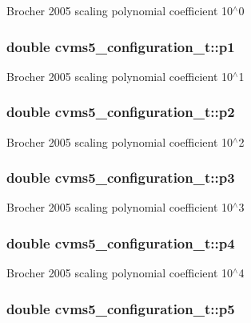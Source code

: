 Brocher 2005 scaling polynomial coefficient 10$^\wedge$0 \hypertarget{structcvms5__configuration__t_a8bf5ffc779374ab9448d217d104b6182}{
\subsubsection[{p1}]{\setlength{\rightskip}{0pt plus 5cm}double cvms5\+\_\+configuration\+\_\+t\+::p1}}\label{structcvms5__configuration__t_a8bf5ffc779374ab9448d217d104b6182}
Brocher 2005 scaling polynomial coefficient 10$^\wedge$1 \hypertarget{structcvms5__configuration__t_aa460736127fc2535673fc18800c6eb0c}{
\subsubsection[{p2}]{\setlength{\rightskip}{0pt plus 5cm}double cvms5\+\_\+configuration\+\_\+t\+::p2}}\label{structcvms5__configuration__t_aa460736127fc2535673fc18800c6eb0c}
Brocher 2005 scaling polynomial coefficient 10$^\wedge$2 \hypertarget{structcvms5__configuration__t_a03959cb46e3581897f31fff80159c67c}{
\subsubsection[{p3}]{\setlength{\rightskip}{0pt plus 5cm}double cvms5\+\_\+configuration\+\_\+t\+::p3}}\label{structcvms5__configuration__t_a03959cb46e3581897f31fff80159c67c}
Brocher 2005 scaling polynomial coefficient 10$^\wedge$3 \hypertarget{structcvms5__configuration__t_a12aafb20aa62f080b7e2b89afc7d82fb}{
\subsubsection[{p4}]{\setlength{\rightskip}{0pt plus 5cm}double cvms5\+\_\+configuration\+\_\+t\+::p4}}\label{structcvms5__configuration__t_a12aafb20aa62f080b7e2b89afc7d82fb}
Brocher 2005 scaling polynomial coefficient 10$^\wedge$4 \hypertarget{structcvms5__configuration__t_a40e1c6f8058d9c00ebfb2b4986813acb}{
\subsubsection[{p5}]{\setlength{\rightskip}{0pt plus 5cm}double cvms5\+\_\+configuration\+\_\+t\+::p5}}\label{structcvms5__configuration__t_a40e1c6f8058d9c00ebfb2b4986813acb}
